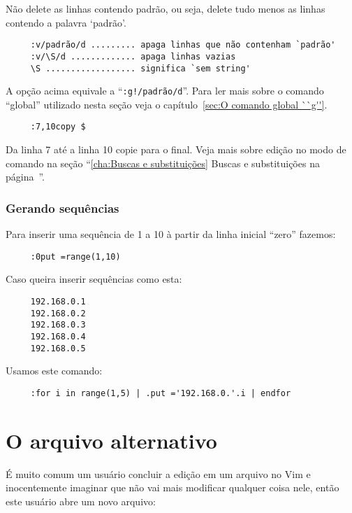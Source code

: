 Não delete as linhas contendo padrão, ou seja, delete tudo menos as linhas
contendo a palavra `padrão'. 

\begin{verbatim}
     :v/padrão/d ......... apaga linhas que não contenham `padrão'
     :v/\S/d ............. apaga linhas vazias
     \S .................. significa `sem string'
\end{verbatim}

A opção acima equivale a ``\verb+:g!/padrão/d+''.  Para ler mais sobre
o comando ``global'' utilizado nesta seção veja o capítulo~\ref{sec:O comando global ``g''}.

\begin{verbatim}
     :7,10copy $
\end{verbatim}

Da linha 7 até a linha 10 copie para o final. {\Large {}}
Veja mais sobre edição no modo de comando na seção ``\ref{cha:Buscas e
substituições} Buscas e substituições na página~\pageref{cha:Buscas e substituições}''.

\subsubsection{Gerando sequências}
Para inserir uma sequência de 1 a 10 à partir da linha inicial ``zero'' fazemos:

\begin{verbatim}
     :0put =range(1,10)
\end{verbatim}

Caso queira inserir sequências como esta:

\begin{verbatim}
     192.168.0.1
     192.168.0.2
     192.168.0.3
     192.168.0.4
     192.168.0.5
\end{verbatim}

Usamos este comando:

\begin{verbatim}
     :for i in range(1,5) | .put ='192.168.0.'.i | endfor
\end{verbatim}

\section{O arquivo alternativo}
\label{O arquivo alternativo}

É muito comum um usuário concluir a edição em um arquivo no Vim e
inocentemente imaginar que não vai mais modificar qualquer coisa nele, então
este usuário abre um novo arquivo:

